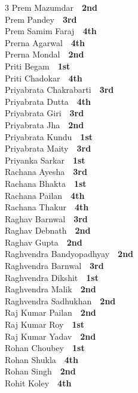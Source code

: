 \documentclass[11pt,a4paper]{article}
\begin{document}
\begin{multicols}{3}
Prem Mazumdar~\dotfill~\textbf{2nd}\\
Prem Pandey~\dotfill~\textbf{3rd}\\
Prem Samim Faraj~\dotfill~\textbf{4th}\\
Prerna Agarwal~\dotfill~\textbf{4th}\\
Prerna Mondal~\dotfill~\textbf{2nd}\\
Priti Begam~\dotfill~\textbf{1st}\\
Priti Chadokar~\dotfill~\textbf{4th}\\
Priyabrata Chakrabarti~\dotfill~\textbf{3rd}\\
Priyabrata Dutta~\dotfill~\textbf{4th}\\
Priyabrata Giri~\dotfill~\textbf{3rd}\\
Priyabrata Jha~\dotfill~\textbf{2nd}\\
Priyabrata Kundu~\dotfill~\textbf{1st}\\
Priyabrata Maity~\dotfill~\textbf{3rd}\\
Priyanka Sarkar~\dotfill~\textbf{1st}\\
Rachana Ayesha~\dotfill~\textbf{3rd}\\
Rachana Bhakta~\dotfill~\textbf{1st}\\
Rachana Pailan~\dotfill~\textbf{4th}\\
Rachana Thakur~\dotfill~\textbf{4th}\\
Raghav Barnwal~\dotfill~\textbf{3rd}\\
Raghav Debnath~\dotfill~\textbf{2nd}\\
Raghav Gupta~\dotfill~\textbf{2nd}\\
Raghvendra Bandyopadhyay~\dotfill~\textbf{2nd}\\
Raghvendra Barnwal~\dotfill~\textbf{3rd}\\
Raghvendra Dikshit~\dotfill~\textbf{1st}\\
Raghvendra Malik~\dotfill~\textbf{2nd}\\
Raghvendra Sadhukhan~\dotfill~\textbf{2nd}\\
Raj Kumar Pailan~\dotfill~\textbf{2nd}\\
Raj Kumar Roy~\dotfill~\textbf{1st}\\
Raj Kumar Yadav~\dotfill~\textbf{2nd}\\
Rohan Choubey~\dotfill~\textbf{1st}\\
Rohan Shukla~\dotfill~\textbf{4th}\\
Rohan Singh~\dotfill~\textbf{2nd}\\
Rohit Koley~\dotfill~\textbf{4th}\\

\end{multicols}
\end{document}
